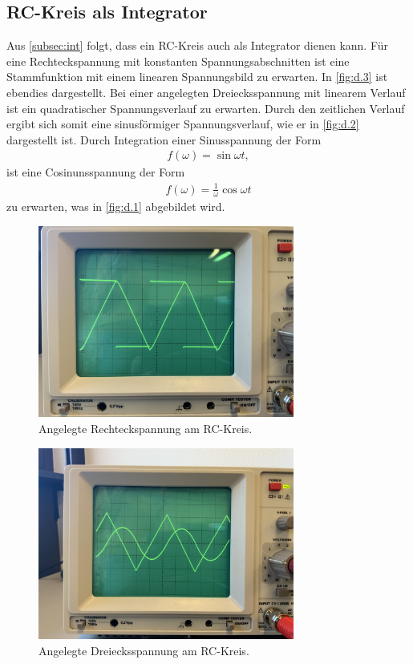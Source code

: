\subsection{RC-Kreis als Integrator}
\label{subsec:integr}
Aus \autoref{subsec:int} folgt, dass ein RC-Kreis auch als Integrator dienen kann.
Für eine Rechteckspannung mit konstanten Spannungsabschnitten ist eine Stammfunktion mit einem linearen Spannungsbild zu erwarten.
In \autoref{fig:d.3} ist ebendies dargestellt.
Bei einer angelegten Dreiecksspannung mit linearem Verlauf ist ein quadratischer Spannungsverlauf zu erwarten.
Durch den zeitlichen Verlauf ergibt sich somit eine sinusförmiger Spannungsverlauf, wie er in \autoref{fig:d.2} dargestellt ist.
Durch Integration einer Sinusspannung der Form 
\begin{align*}
    f(\omega) = \sin{\omega t},
\end{align*}
ist eine Cosinunsspannung der Form
\begin{align*}
    f(\omega) = \frac{1}{\omega} \cos{\omega t}
\end{align*}
zu erwarten, was in \autoref{fig:d.1} abgebildet wird.
\begin{figure}[H]
    \centering
    \includegraphics[width=0.75\textwidth]{Dateien/d.3.jpeg}
    \caption{Angelegte Rechteckspannung am RC-Kreis.}
    \label{fig:d.3}
\end{figure}
\begin{figure}[H]
    \centering
    \includegraphics[width=0.75\textwidth]{Dateien/d.2.jpeg}
    \caption{Angelegte Dreiecksspannung am RC-Kreis.}
    \label{fig:d.2}
\end{figure}
